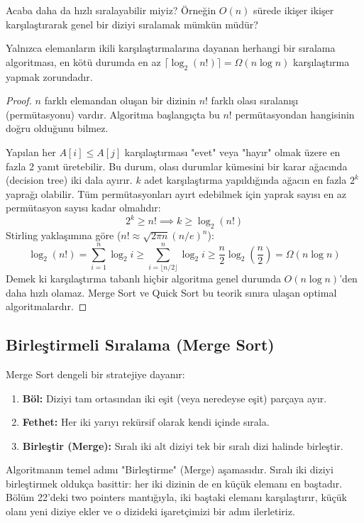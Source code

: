 Acaba daha da hızlı sıralayabilir miyiz? Örneğin $O(n)$ sürede ikişer ikişer karşılaştırarak genel bir diziyi sıralamak mümkün müdür?

\begin{theorem}
Yalnızca elemanların ikili karşılaştırmalarına dayanan herhangi bir sıralama algoritması, en kötü durumda en az $\lceil \log_2(n!) \rceil = \Omega(n \log n)$ karşılaştırma yapmak zorundadır.
\end{theorem}

\begin{proof}
$n$ farklı elemandan oluşan bir dizinin $n!$ farklı olası sıralanışı (permütasyonu) vardır. Algoritma başlangıçta bu $n!$ permütasyondan hangisinin doğru olduğunu bilmez.

Yapılan her $A[i] \le A[j]$ karşılaştırması "evet" veya "hayır" olmak üzere en fazla 2 yanıt üretebilir. Bu durum, olası durumlar kümesini bir karar ağacında (decision tree) iki dala ayırır.
$k$ adet karşılaştırma yapıldığında ağacın en fazla $2^k$ yaprağı olabilir. Tüm permütasyonları ayırt edebilmek için yaprak sayısı en az permütasyon sayısı kadar olmalıdır:
\[
2^k \ge n! \implies k \ge \log_2(n!)
\]
Stirling yaklaşımına göre ($n! \approx \sqrt{2\pi n} (n/e)^n$):
\[
\log_2(n!) = \sum_{i=1}^n \log_2 i \ge \sum_{i=\lfloor n/2 \rfloor}^n \log_2 i \ge \frac{n}{2} \log_2\left(\frac{n}{2}\right) = \Omega(n \log n)
\]
Demek ki karşılaştırma tabanlı hiçbir algoritma genel durumda $O(n \log n)$'den daha hızlı olamaz. Merge Sort ve Quick Sort bu teorik sınıra ulaşan optimal algoritmalardır.
\end{proof}

\subsection{Birleştirmeli Sıralama (Merge Sort)}

Merge Sort dengeli bir stratejiye dayanır:
\begin{enumerate}
    \item \textbf{Böl:} Diziyi tam ortasından iki eşit (veya neredeyse eşit) parçaya ayır.
    \item \textbf{Fethet:} Her iki yarıyı rekürsif olarak kendi içinde sırala.
    \item \textbf{Birleştir (Merge):} Sıralı iki alt diziyi tek bir sıralı dizi halinde birleştir.
\end{enumerate}

Algoritmanın temel adımı "Birleştirme" (Merge) aşamasıdır. Sıralı iki diziyi birleştirmek oldukça basittir: her iki dizinin de en küçük elemanı en baştadır. Bölüm 22'deki two pointers mantığıyla, iki baştaki elemanı karşılaştırır, küçük olanı yeni diziye ekler ve o dizideki işaretçimizi bir adım ilerletiriz.

